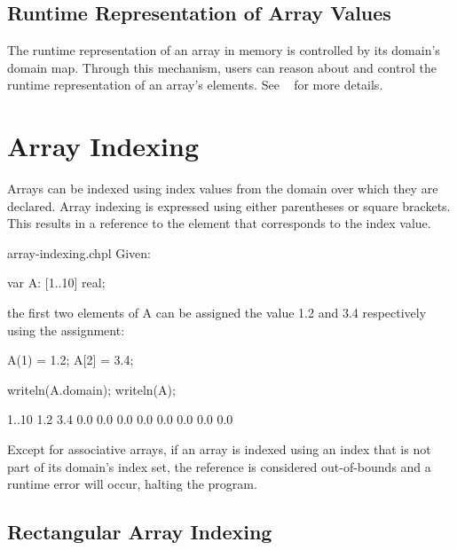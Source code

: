 \subsection{Runtime Representation of Array Values}
\label{Array_Runtime_Representation}

The runtime representation of an array in memory is controlled by its
domain's domain map.  Through this mechanism, users can reason about
and control the runtime representation of an array's elements.  See
~ for more details.


\section{Array Indexing}
\label{Array_Indexing}

Arrays can be indexed using index values from the domain over which
they are declared.  Array indexing is expressed using either
parentheses or square brackets.  This results in a reference to the
element that corresponds to the index value.


\begin{chapelexample}{array-indexing.chpl}
Given:
\begin{chapel}
var A: [1..10] real;
\end{chapel}
the first two elements of A can be assigned the value 1.2 and 3.4
respectively using the assignment:
\begin{chapel}
A(1) = 1.2;
A[2] = 3.4;
\end{chapel}
\begin{chapelpost}
writeln(A.domain);
writeln(A);
\end{chapelpost}
\begin{chapeloutput}
{1..10}
1.2 3.4 0.0 0.0 0.0 0.0 0.0 0.0 0.0 0.0
\end{chapeloutput}
\end{chapelexample}

Except for associative arrays, if an array is indexed using an index that
is not part of its domain's index set, the reference is considered
out-of-bounds and a runtime error will occur, halting the program.

\subsection{Rectangular Array Indexing}
\label{Rectangular_Array_Indexing}

